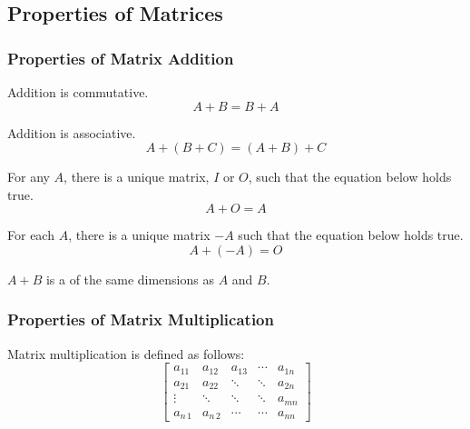 \subsection{Properties of Matrices}\label{subsec:Properties_Matrices}
\subsubsection{Properties of Matrix Addition}\label{subsubsec:Properties_Matrix_Addition}
\begin{propertylist}
\item {} Addition is commutative.\label{prop:Matrix_Add_Commutative}
  \begin{equation}\label{eq:Matrix_Add_Commutative}
    A+B = B+A
  \end{equation}

\item {} Addition is associative.\label{prop:Matrix_Add_Associative}
  \begin{equation}\label{eq:Matrix_Add_Associative}
    A+(B+C) = (A+B) + C
  \end{equation}

\item For any  $A$, there is a unique matrix, $I$ or $O$, such that the equation below holds true.\label{prop:Matrix_Additive_Identity}
  \begin{equation}\label{eq:Matrix_Additive_Identity}
    A+O = A
  \end{equation}

\item For each  $A$, there is a unique matrix $-A$ such that the equation below holds true.\label{prop:Matrix_Additive_Inverse}
  \begin{equation}\label{eq:Matrix_Additive_Inverse}
    A+(-A) = O
  \end{equation}

\item $A+B$ is a  of the same dimensions as $A$ and $B$.\label{prop:Matrix_Addition_Closure}
\end{propertylist}

\subsubsection{Properties of Matrix Multiplication}\label{subsubsec:Properties_Matrix_Multiplication}
Matrix multiplication is defined as follows:
\begin{equation}\label{eq:Matrix_Multiplication}
  \begin{bmatrix}
    a_{11} & a_{12} & a_{13} & \cdots & a_{1n} \\
    a_{21} & a_{22} & \ddots & \ddots & a_{2n} \\
    \vdots & \ddots & \ddots & \ddots & a_{mn} \\
    a_{n\,1} & a_{n\,2} & \cdots & \cdots & a_{nn}
  \end{bmatrix}
\end{equation}

